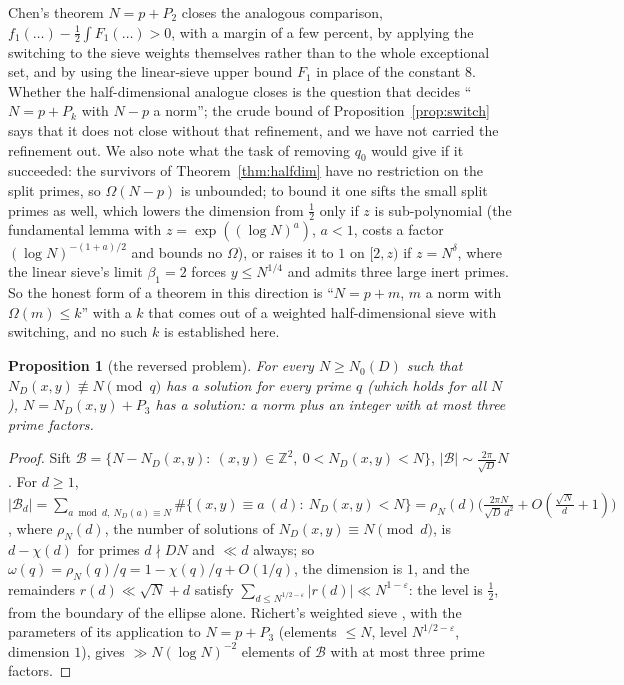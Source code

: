 \documentclass[11pt]{amsart}
\newtheorem{proposition}[theorem]{Proposition}
\theoremstyle{definition}
\theoremstyle{remark}
\newcommand{\e}{\varepsilon}
\newcommand{\Z}{\mathbb Z}
\begin{document}
Chen's theorem $N=p+P_2$ closes the analogous comparison, $f_1(\dots)-\frac12\int F_1(\dots)>0$, with a margin of a few percent, by applying the switching to the sieve weights themselves rather than to the whole exceptional set, and by using the linear-sieve upper bound $F_1$ in place of the constant $8$. Whether the half-dimensional analogue closes is the question that decides ``$N=p+P_k$ with $N-p$ a norm''; the crude bound of Proposition~\ref{prop:switch} says that it does not close without that refinement, and we have not carried the refinement out. We also note what the task of removing $q_0$ would give if it succeeded: the survivors of Theorem~\ref{thm:halfdim} have no restriction on the split primes, so $\Omega(N-p)$ is unbounded; to bound it one sifts the small split primes as well, which lowers the dimension from $\frac12$ only if $z$ is sub-polynomial (the fundamental lemma with $z=\exp((\log N)^a)$, $a<1$, costs a factor $(\log N)^{-(1+a)/2}$ and bounds no $\Omega$), or raises it to $1$ on $[2,z)$ if $z=N^\delta$, where the linear sieve's limit $\beta_1=2$ forces $y\le N^{1/4}$ and admits three large inert primes. So the honest form of a theorem in this direction is ``$N=p+m$, $m$ a norm with $\Omega(m)\le k$'' with a $k$ that comes out of a weighted half-dimensional sieve with switching, and no such $k$ is established here.

\begin{proposition}[the reversed problem]\label{prop:reverse}
For every $N\ge N_0(D)$ such that $N_D(x,y)\not\equiv N\pmod q$ has a solution for every prime $q$ (which holds for all $N$), $N=N_D(x,y)+P_3$ has a solution: a norm plus an integer with at most three prime factors.
\end{proposition}
\begin{proof}
Sift $\mathcal B=\{N-N_D(x,y):\ (x,y)\in\Z^2,\ 0<N_D(x,y)<N\}$, $|\mathcal B|\sim\frac{2\pi}{\sqrt D}N$. For $d\ge1$, $|\mathcal B_d|=\sum_{a\bmod d,\ N_D(a)\equiv N}\#\{(x,y)\equiv a\ (d):\ N_D(x,y)<N\}=\rho_N(d)\bigl(\frac{2\pi N}{\sqrt D\,d^2}+O(\frac{\sqrt N}d+1)\bigr)$, where $\rho_N(d)$, the number of solutions of $N_D(x,y)\equiv N\pmod d$, is $d-\chi(d)$ for primes $d\nmid DN$ and $\ll d$ always; so $\omega(q)=\rho_N(q)/q=1-\chi(q)/q+O(1/q)$, the dimension is $1$, and the remainders $r(d)\ll\sqrt N+d$ satisfy $\sum_{d\le N^{1/2-\e}}|r(d)|\ll N^{1-\e}$: the level is $\frac12$, from the boundary of the ellipse alone. Richert's weighted sieve \cite[Chapter~9]{HR}, with the parameters of its application to $N=p+P_3$ \cite{Richert69} (elements $\le N$, level $N^{1/2-\e}$, dimension $1$), gives $\gg N(\log N)^{-2}$ elements of $\mathcal B$ with at most three prime factors.
\end{proof}
\end{document}
